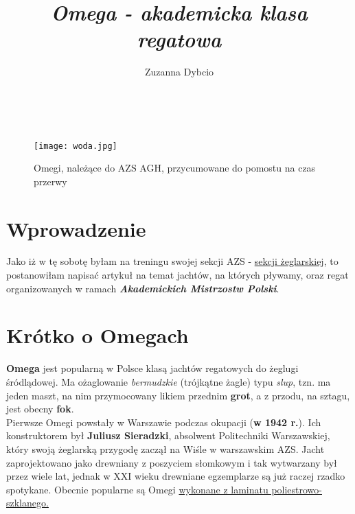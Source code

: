 \documentclass{article}
\title{\emph{\textbf{Omega} - akademicka klasa regatowa}}
\author{Zuzanna Dybcio}
\date{}
\begin{document}
\maketitle
\tableofcontents
~\\

\begin{figure}[h]
    \centering 
    \texttt{[image: woda.jpg]}
    \caption{Omegi, należące do AZS AGH, przycumowane do pomostu na czas przerwy} 
\end{figure}

\section*{Wprowadzenie}
Jako iż w tę sobotę byłam na treningu swojej sekcji AZS - \underline{sekcji żeglarskiej}, to postanowiłam napisać artykuł na temat jachtów, na których pływamy, oraz regat organizowanych w ramach \textbf{\emph{Akademickich Mistrzostw Polski}}.

\section{Krótko o Omegach}
\textbf{Omega} jest popularną w Polsce klasą jachtów regatowych do żeglugi śródlądowej. Ma ożaglowanie \emph{bermudzkie} (trójkątne żagle) typu \emph{slup}, tzn. ma jeden maszt, na nim przymocowany likiem przednim \textbf{grot}, a z przodu, na sztagu, jest obecny \textbf{fok}.\\
Pierwsze Omegi powstały w Warszawie podczas okupacji (\textbf{w 1942 r.}). Ich konstruktorem był \textbf{Juliusz Sieradzki}, absolwent Politechniki Warszawskiej, który swoją żeglarską przygodę zaczął na Wiśle w warszawskim AZS. Jacht zaprojektowano jako drewniany z poszyciem słomkowym i tak wytwarzany był przez wiele lat, jednak w XXI wieku drewniane egzemplarze są już raczej rzadko spotykane. Obecnie popularne są Omegi \underline{wykonane z laminatu poliestrowo-szklanego.}
\end{document}
